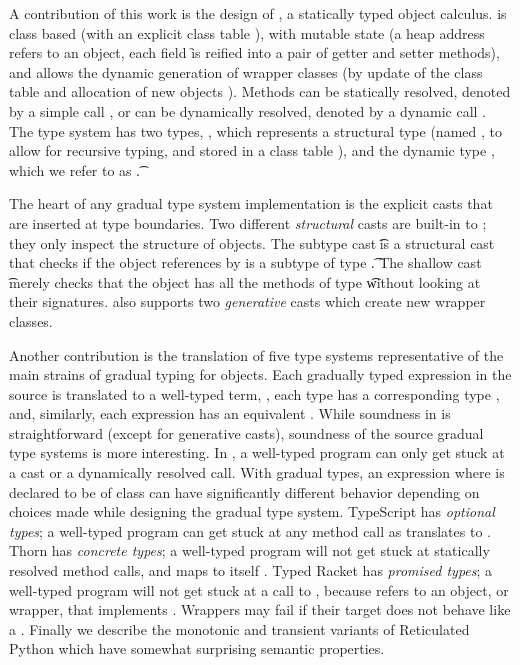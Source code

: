 \documentclass[a4paper,USenglish]{tex/lipics-v2016}
\renewcommand{\u}[1]{\underline{#1}\xspace}
\begin{document}
A contribution of this work is the design of \kafka, a statically typed object
calculus.  \kafka is class based (with an explicit class table \K), with mutable
state (a heap address \a refers to an object, each field \f is reified into a
pair of getter and setter methods), and allows the dynamic generation of wrapper
classes (by update of the class table \K and allocation of new objects \a).
Methods can be statically resolved, denoted by a simple call \Call\a\m\x, or can
be dynamically resolved, denoted by a dynamic call \DynCall\a\m\x. The \kafka
type system has two types, \C, which represents a structural type (named \C, to
allow for recursive typing, and stored in a class table \K), and the dynamic
type \any, which we refer to as \t.

The heart of any gradual type system implementation is the explicit casts that
are inserted at type boundaries.  Two different \emph{structural} casts are
built-in to \kafka; they only inspect the structure of objects.  The subtype
cast \SubCast\t\a is a structural cast that checks if the object references by
\a is a subtype of type \t. The shallow cast \ShaCast\t\a merely checks that the
object has all the methods of type \t without looking at their signatures.
\kafka also supports two \emph{generative} casts which create new wrapper
classes. 


Another contribution is the translation of five type systems representative
of the main strains of gradual typing for objects. Each gradually typed
expression \HT{\u\e}{\u\T} in the source is translated to a well-typed
\kafka term, \HT\e\T, each type \u\T has a corresponding \kafka type \T,
and, similarly, each expression \u\e has an equivalent \e. While soundness
in \kafka is straightforward (except for generative casts), soundness of the
source gradual type systems is more interesting.  In \kafka, a well-typed
program can only get stuck at a cast or a dynamically resolved call.  With
gradual types, an expression \Call{\u\x}\m{\u{\x'}} where \u\x is declared
to be of class \u\C can have significantly different behavior depending on
choices made while designing the gradual type system. TypeScript has
\emph{optional types}; a well-typed program can get stuck at any method call
as \u\C translates to \any. Thorn has \emph{concrete types}; a well-typed
program will not get stuck at statically resolved method calls, and \u\C
maps to itself \C. Typed Racket has \emph{promised types}; a well-typed
program will not get stuck at a call to \m, because \u\x refers to an
object, or wrapper, that implements \m.  Wrappers may fail if their target
does not behave like a \u\C. Finally we describe the monotonic
and transient variants of Reticulated Python which have somewhat surprising
semantic properties.
\end{document}
